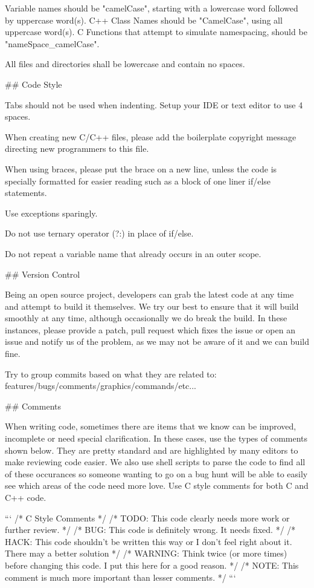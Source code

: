 Variable names should be "camelCase", starting with a lowercase word followed by uppercase word(s).
C++ Class Names should be "CamelCase", using all uppercase word(s).
C Functions that attempt to simulate namespacing, should be "nameSpace_camelCase".

All files and directories shall be lowercase and contain no spaces.

## Code Style

Tabs should not be used when indenting. Setup your IDE or text editor to use 4 spaces.

When creating new C/C++ files, please add the boilerplate copyright message directing
new programmers to this file.

When using braces, please put the brace on a new line, unless the code is specially formatted
for easier reading such as a block of one liner if/else statements.

Use exceptions sparingly.

Do not use ternary operator (?:) in place of if/else.

Do not repeat a variable name that already occurs in an outer scope.

## Version Control 

Being an open source project, developers can grab the latest code at any time
and attempt to build it themselves. We try our best to ensure that it will build smoothly
at any time, although occasionally we do break the build. In these instances,
please provide a patch, pull request which fixes the issue or open an issue and
notify us of the problem, as we may not be aware of it and we can build fine.

Try to group commits based on what they are related to: features/bugs/comments/graphics/commands/etc...

## Comments

When writing code, sometimes there are items that we know can be improved,
incomplete or need special clarification. In these cases, use the types of
comments shown below. They are pretty standard and are highlighted by many editors to
make reviewing code easier. We also use shell scripts to parse the code to find
all of these occurances so someone wanting to go on a bug hunt will be able to
easily see which areas of the code need more love. Use C style comments for
both C and C++ code.

```
/* C Style Comments */
/* TODO: This code clearly needs more work or further review. */
/* BUG: This code is definitely wrong. It needs fixed. */
/* HACK: This code shouldn't be written this way or I don't feel right about it. There may a better solution */
/* WARNING: Think twice (or more times) before changing this code. I put this here for a good reason. */
/* NOTE: This comment is much more important than lesser comments. */
```
